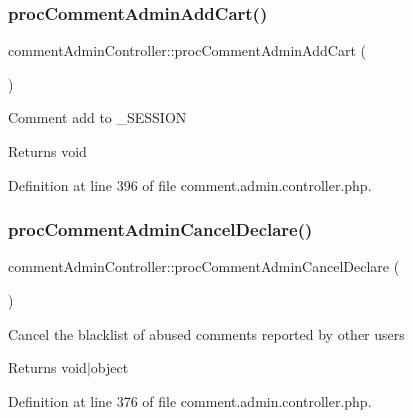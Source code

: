 \subsubsection{\texorpdfstring{proc\+Comment\+Admin\+Add\+Cart()}{procCommentAdminAddCart()}}
{\footnotesize\ttfamily comment\+Admin\+Controller\+::proc\+Comment\+Admin\+Add\+Cart (\begin{DoxyParamCaption}{ }\end{DoxyParamCaption})}

Comment add to \+\_\+\+S\+E\+S\+S\+I\+ON \begin{DoxyReturn}{Returns}
void 
\end{DoxyReturn}


Definition at line 396 of file comment.\+admin.\+controller.\+php.

\mbox{\label{classcommentAdminController_ae0673fe66c74aa6ebfd8c6f1e5d0c627}} 
\subsubsection{\texorpdfstring{proc\+Comment\+Admin\+Cancel\+Declare()}{procCommentAdminCancelDeclare()}}
{\footnotesize\ttfamily comment\+Admin\+Controller\+::proc\+Comment\+Admin\+Cancel\+Declare (\begin{DoxyParamCaption}{ }\end{DoxyParamCaption})}

Cancel the blacklist of abused comments reported by other users \begin{DoxyReturn}{Returns}
void$\vert$object 
\end{DoxyReturn}


Definition at line 376 of file comment.\+admin.\+controller.\+php.

\mbox{\label{classcommentAdminController_a7d6c3e0db01617f4789f42617a876da0}} 
